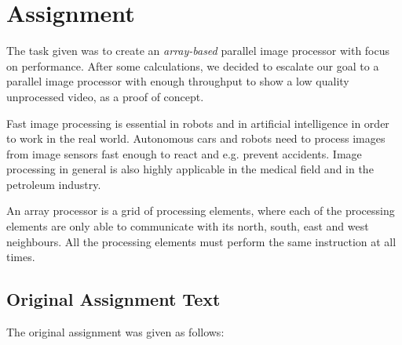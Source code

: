 \section{Assignment}
The task given was to create an {\em array-based} parallel image processor with
focus on performance. After some calculations, we decided to escalate our goal to a parallel image processor
with enough throughput to show a low quality unprocessed video, as a proof of
concept.

Fast image processing is essential in robots\cite{miller1989r-vision,
  thrun2007stanley} and in artificial intelligence\cite{hwang1989parallel} in
order to work in the real world. Autonomous cars and robots need to process
images from image sensors fast enough to react and e.g. prevent
accidents\cite{aufrere2003coll-avoid}. Image processing in general is also
highly applicable in the medical field\cite{luong2009medical-image,
  sternberg1983biomedical} and in the petroleum
industry\cite{ferrari2007steam-images}.

An array processor is a grid of processing elements, where each of the
processing elements are only able to communicate with its north, south, east and
west neighbours. All the processing elements must perform the same instruction
at all times.

\subsection{Original Assignment Text}

The original assignment was given as follows:

